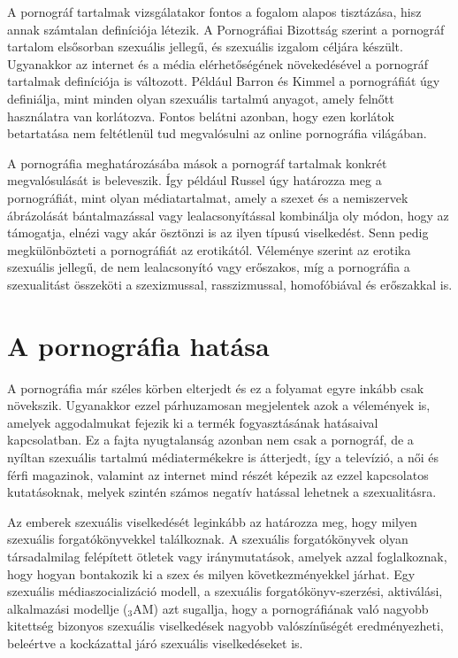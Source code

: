 \documentclass[12pt,a4paper]{article}
\begin{document}
A pornográf tartalmak vizsgálatakor fontos a fogalom alapos tisztázása, hisz annak számtalan definíciója létezik. A Pornográfiai Bizottság \citeyearpar[228–229. o.]{united1986attorney} szerint a pornográf tartalom elsősorban szexuális jellegű, és szexuális izgalom céljára készült. Ugyanakkor az internet és a média elérhetőségének növekedésével a pornográf tartalmak definíciója is változott. Például Barron és Kimmel \citeyearpar{barron2000sexual} a pornográfiát úgy definiálja, mint minden olyan szexuális tartalmú anyagot, amely felnőtt használatra van korlátozva. Fontos belátni azonban, hogy ezen korlátok betartatása nem feltétlenül tud megvalósulni az online pornográfia világában.

A pornográfia meghatározásába mások a pornográf tartalmak konkrét megvalósulását is beleveszik. Így például Russel \citeyearpar{russell1993against} úgy határozza meg a pornográfiát, mint olyan médiatartalmat, amely a szexet és a nemiszervek ábrázolását bántalmazással vagy lealacsonyítással kombinálja oly módon, hogy az támogatja, elnézi vagy akár ösztönzi is az ilyen típusú viselkedést. Senn \citeyearpar{senn1993women} pedig megkülönbözteti a pornográfiát az erotikától. Véleménye szerint az erotika szexuális jellegű, de nem lealacsonyító vagy erőszakos, míg a pornográfia a szexualitást összeköti a szexizmussal, rasszizmussal, homofóbiával és erőszakkal is.

\section{A pornográfia hatása}

A pornográfia már széles körben elterjedt és ez a folyamat egyre inkább csak növekszik. Ugyanakkor ezzel párhuzamosan megjelentek azok a vélemények is, amelyek aggodalmukat fejezik ki a termék fogyasztásának hatásaival kapcsolatban. Ez a fajta nyugtalanság azonban nem csak a pornográf, de a nyíltan szexuális tartalmú médiatermékekre is átterjedt, így a televízió, a női és férfi magazinok, valamint az internet mind részét képezik az ezzel kapcsolatos kutatásoknak, melyek szintén számos negatív hatással lehetnek a szexualitásra. \citep{attwood2005people}

Az emberek szexuális viselkedését leginkább az határozza meg, hogy milyen szexuális forgatókönyvekkel találkoznak. A szexuális forgatókönyvek olyan társadalmilag felépített ötletek vagy iránymutatások, amelyek azzal foglalkoznak, hogy hogyan bontakozik ki a szex és milyen következményekkel járhat. Egy szexuális médiaszocializáció modell, a szexuális forgatókönyv-szerzési, aktiválási, alkalmazási modellje ($_3$AM) azt sugallja, hogy a pornográfiának való nagyobb kitettség bizonyos szexuális viselkedések nagyobb valószínűségét eredményezheti, beleértve a kockázattal járó szexuális viselkedéseket is. \citep{gagnon2017sexual, wright2011mass}
\end{document}
